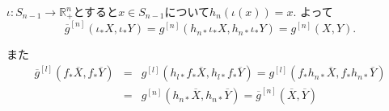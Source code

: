 \documentclass{jsarticle}
\newcommand{\RR}{\mathbb{R}}
\theoremstyle{definition}
\numberwithin{theorem}{section}
\begin{document}
$\iota:S_{n-1}\rightarrow \RR^n_+$とすると$x \in S_{n-1}$について$h_n(\iota(x))=x$.
よって
\[
\overline{g}^{[n]}(\iota_* X, \iota_* Y)=g^{[n]}(h_{n*}  \iota_* X, h_{n*} \iota_* Y)=g^{[n]}(X,Y).
\]

また
\begin{eqnarray*}
\overline{g}^{[l]}(f_* \overline{X}, f_* \overline{Y})&=&g^{[l]}(h_{l*} f_* \overline{X}, h_{l*} f_* \overline{Y})=g^{[l]}(f_* h_{n*} \overline{X}, f_* h_{n*} \overline{Y})\\
&=&g^{[n]}(h_{n*} \overline{X}, h_{n*} \overline{Y})=\overline{g}^{[n]}(\overline{X}, \overline{Y})
\end{eqnarray*}
\end{document}
